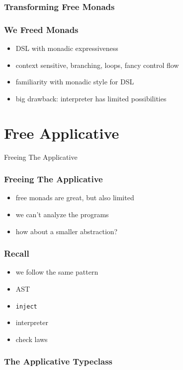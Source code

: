 \documentclass{beamer}
\newcommand{\recipe}{%
  \begin{itemize}
  \item AST
  \item \texttt{inject}
  \item interpreter
  \item check laws
  \end{itemize}
}
\begin{document}
\begin{frame}[fragile]
  \frametitle{Transforming Free Monads}
\end{frame}

\begin{frame}
  \frametitle{We Freed Monads}
  \begin{itemize}
  \item DSL with monadic expressiveness
  \item context sensitive, branching, loops, fancy control flow
  \item familiarity with monadic style for DSL
  \item big drawback: interpreter has limited possibilities
  \end{itemize}
\end{frame}

\section{Free Applicative}\label{sec:free-applicative}
\begin{frame}
  \begin{center}
    \Huge
    Freeing The Applicative
  \end{center}
\end{frame}

\begin{frame}
  \frametitle{Freeing The Applicative}
  \begin{itemize}
  \item free monads are great, but also limited
  \item we can't analyze the programs
  \item how about a smaller abstraction?
  \end{itemize}
\end{frame}

\begin{frame}
  \frametitle{Recall}
  \begin{itemize}
  \item we follow the same pattern
  \end{itemize}
  \recipe{}
\end{frame}

\begin{frame}[fragile]
  \frametitle{The Applicative Typeclass}
  \inputminted{scala}{snippets/applicative-typeclass.scala}
\end{frame}
\end{document}
